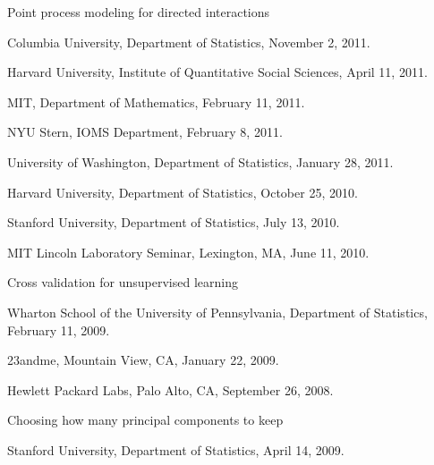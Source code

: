 \documentclass[10pt,letterpaper]{article}
\renewenvironment{itemize}{
  \begin{list}{}{
    \setlength{\leftmargin}{1.5em}
    \setlength{\itemsep}{0.25em}
    \setlength{\parskip}{0pt}
    \setlength{\parsep}{0.25em}
  }
}{
  \end{list}
}
\begin{document}
\begin{itemize}

\item Point process modeling for directed interactions
  \begin{itemize}
  \item Columbia University, Department of Statistics, November 2, 2011.
  \item Harvard University, Institute of Quantitative Social Sciences, April 11, 2011.
  \item MIT, Department of Mathematics, February 11, 2011.
  \item NYU Stern, IOMS Department, February 8, 2011.
  \item University of Washington, Department of Statistics, January 28, 2011.
  \item %
    Harvard University, Department of Statistics, October 25, 2010.
  \item %
    Stanford University, Department of Statistics, July 13, 2010.
  \item %
    MIT Lincoln Laboratory Seminar, Lexington, MA, June 11, 2010.
  \end{itemize}


\item Cross validation for unsupervised learning
  \begin{itemize}
    \item Wharton School of the University of Pennsylvania, Department of Statistics,
      February 11, 2009. 
    \item 23andme, Mountain View, CA, January 22, 2009.
    \item Hewlett Packard Labs, Palo Alto, CA, September 26, 2008.
  \end{itemize}

\item Choosing how many principal components to keep
  \begin{itemize}
    \item Stanford University, Department of Statistics, April 14, 2009.
  \end{itemize}

\end{itemize}
\end{document}
